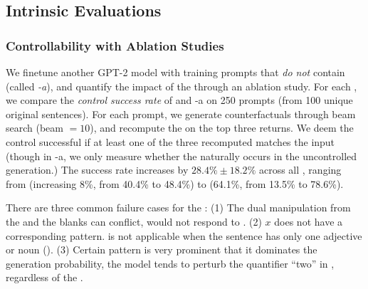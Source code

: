 \subsection{Intrinsic Evaluations}
\label{appendix:intrinsic}






\subsubsection{Controllability with Ablation Studies}
\label{appendix:ablation_control}

We finetune another GPT-2 model with training prompts that \emph{do not} contain \tagstrs (called \emph{\sysname-a}), and quantify the impact of the \tagstrshorts through an ablation study.
For each \tagstr, we compare the \emph{control success rate} of \sysname and \sysname-a on 250 prompts (from 100 unique original sentences).
For each prompt, we generate counterfactuals through beam search (beam $=10$), and recompute the \tagstrshorts on the top three returns.
We deem the control successful if at least one of the three recomputed \tagstrshorts matches the input (though in \sysname-a, we only measure whether the \tagstrshort naturally occurs in the uncontrolled generation.)
The success rate increases by $28.4\% \pm 18.2\%$ across all \tagstrs, ranging from  (increasing 8\%, from 40.4\% to 48.4\%) to  (64.1\%, from 13.5\% to 78.6\%).

There are three common failure cases for the \tagstrshorts:
(1) The dual manipulation from the \tagstrs and the blanks can conflict, \eg {} would not respond to .
(2) $x$ does not have a corresponding pattern.  is not applicable when the sentence has only one adjective or noun (\eg {}).
(3) Certain pattern is very prominent that it dominates the generation probability, \eg the model tends to perturb the quantifier ``two'' in , regardless of the \tagstrshort.







